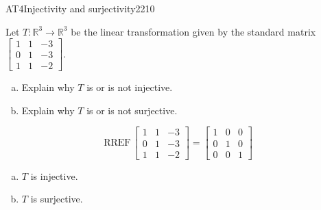 \begin{exercise}{AT4}{Injectivity and surjectivity}{2210} 
\begin{exerciseStatement} 

 Let \(T:\mathbb{R}^3 \to \mathbb{R}^3\) be the linear transformation given by the standard matrix \(\left[\begin{array}{ccc}
1 & 1 & -3 \\
0 & 1 & -3 \\
1 & 1 & -2
\end{array}\right]\). 

 

\begin{enumerate}[(a)]
\item 

Explain why \(T\) is or is not injective.


\item 

Explain why \(T\) is or is not surjective.


\end{enumerate}

     \end{exerciseStatement}
 \begin{exerciseAnswer} 

\[\mathrm{RREF}\,\left[\begin{array}{ccc}
1 & 1 & -3 \\
0 & 1 & -3 \\
1 & 1 & -2
\end{array}\right]=\left[\begin{array}{ccc}
1 & 0 & 0 \\
0 & 1 & 0 \\
0 & 0 & 1
\end{array}\right]\]

 

\begin{enumerate}[(a)]
\item  

\(T\) is injective.

 
\item  

\(T\) is surjective.

 
\end{enumerate}

     \end{exerciseAnswer}
 \end{exercise}


